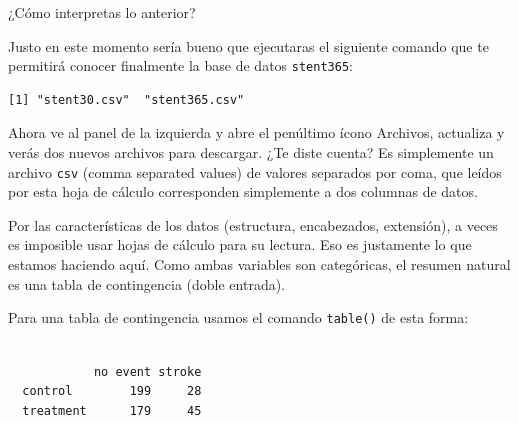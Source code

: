 \documentclass[
  spanish,
  letterpaper,
  DIV=11,
  numbers=noendperiod]{scrartcl}
\newenvironment{Shaded}{\begin{snugshade}}{\end{snugshade}}
\newcommand{\AttributeTok}[1]{\textcolor[rgb]{0.40,0.45,0.13}{#1}}
\newcommand{\ConstantTok}[1]{\textcolor[rgb]{0.56,0.35,0.01}{#1}}
\newcommand{\FunctionTok}[1]{\textcolor[rgb]{0.28,0.35,0.67}{#1}}
\newcommand{\NormalTok}[1]{\textcolor[rgb]{0.00,0.23,0.31}{#1}}
\newcommand{\OtherTok}[1]{\textcolor[rgb]{0.00,0.23,0.31}{#1}}
\newcommand{\SpecialCharTok}[1]{\textcolor[rgb]{0.37,0.37,0.37}{#1}}
\newcommand{\StringTok}[1]{\textcolor[rgb]{0.13,0.47,0.30}{#1}}
\begin{document}
¿Cómo interpretas lo anterior?

Justo en este momento sería bueno que ejecutaras el siguiente comando
que te permitirá conocer finalmente la base de datos \texttt{stent365}:

\begin{Shaded}
\end{Shaded}

\begin{verbatim}
[1] "stent30.csv"  "stent365.csv"
\end{verbatim}

Ahora ve al panel de la izquierda y abre el penúltimo ícono Archivos,
actualiza y verás dos nuevos archivos para descargar. ¿Te diste cuenta?
Es simplemente un archivo \texttt{csv} (comma separated values) de
valores separados por coma, que leídos por esta hoja de cálculo
corresponden simplemente a dos columnas de datos.

Por las características de los datos (estructura, encabezados,
extensión), a veces es imposible usar hojas de cálculo para su lectura.
Eso es justamente lo que estamos haciendo aquí. Como ambas variables son
categóricas, el resumen natural es una tabla de contingencia (doble
entrada).

Para una tabla de contingencia usamos el comando \texttt{table()} de
esta forma:

\begin{Shaded}
\end{Shaded}

\begin{verbatim}
           
            no event stroke
  control        199     28
  treatment      179     45
\end{verbatim}
\end{document}
